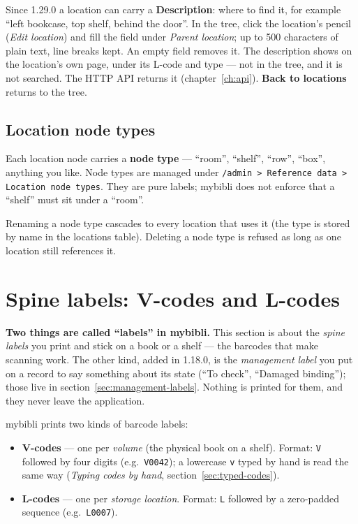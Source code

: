 Since 1.29.0 a location can carry a \textbf{Description}: where to find
it, for example ``left bookcase, top shelf, behind the door''. In the
tree, click the location's pencil (\emph{Edit location}) and fill
the field under \emph{Parent location}; up to 500 characters of plain
text, line breaks kept. An
empty field removes it. The description shows on the location's own
page, under its L-code and type --- not in the tree, and it is not
searched. The HTTP API returns it (chapter~\ref{ch:api}). \textbf{Back
to locations} returns to the tree.

\subsection*{Location node types}

Each location node carries a \textbf{node type} —
``room'', ``shelf'', ``row'', ``box'', anything you like. Node types
are managed under \texttt{/admin > Reference data > Location node
types}. They are pure labels; mybibli does not enforce that a
``shelf'' must sit under a ``room''.

\begin{tip}
Renaming a node type cascades to every location that uses it (the
type is stored by name in the locations table). Deleting a node type
is refused as long as one location still references it.
\end{tip}

\section{Spine labels: V-codes and L-codes}\label{sec:labels}

\begin{note}
\textbf{Two things are called ``labels'' in mybibli.} This section is
about the \emph{spine labels} you print and stick on a book or a shelf
— the barcodes that make scanning work. The other kind, added in
1.18.0, is the \emph{management label} you put on a record to say
something about its state (``To check'', ``Damaged binding''); those
live in section~\ref{sec:management-labels}. Nothing is printed for
them, and they never leave the application.
\end{note}

mybibli prints two kinds of barcode labels:

\begin{itemize}
  \item \textbf{V-codes} — one per
        \emph{volume} (the physical book on a shelf).
        Format: \texttt{V} followed by four digits
        (e.g.\ \texttt{V0042}); a lowercase \texttt{v} typed by hand is
        read the same way (\emph{Typing codes by hand},
        section~\ref{sec:typed-codes}).
  \item \textbf{L-codes} — one per
        \emph{storage location}. Format: \texttt{L} followed by a
        zero-padded sequence (e.g.\ \texttt{L0007}).
\end{itemize}

